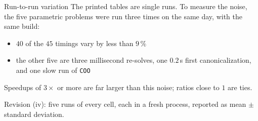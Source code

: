 \documentclass[10pt,mathserif,aspectratio=169]{beamer}
\newcommand{\bul}{\setlength\itemsep{1.1ex}}
\begin{document}
\begin{frame}[label=bk-variance]{Run-to-run variation}
\vspace{-0.5ex}
{\small The printed tables are single runs. To measure the noise, the five parametric problems
were run three times on the same day, with the same build:}

\vspace{1ex}
\begin{itemize}\small\bul
  \item $40$ of the $45$ timings vary by less than $9\,\%$
  \item the other five are three millisecond re-solves, one $0.2$\,s first canonicalization,
        and one slow run of \texttt{COO}
\end{itemize}

\vspace{1.5ex}
\begin{center}\small\color{polyblue}
Speedups of $3\times$ or more are far larger than this noise; ratios close to $1$ are ties.
\end{center}

\vfill
{\scriptsize\color{black!55} Revision (iv): five runs of every cell, each in a fresh
process, reported as mean $\pm$ standard deviation.}
\end{frame}
\end{document}

